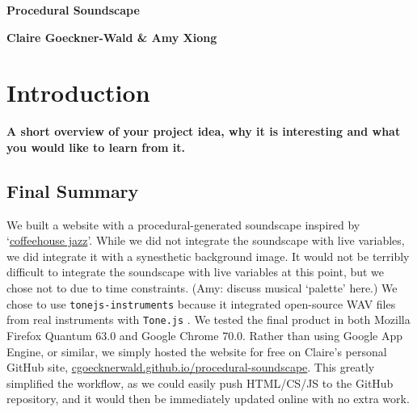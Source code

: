 \documentclass[12pt,a4paper]{article}
\newcommand{\lightcode}[1]{\colorbox{light-gray}{\texttt{#1}}}
\begin{document}
\pagestyle{plain}
 

\begin{center}
{\LARGE{\bf
{{Procedural Soundscape}}
}}
\end{center}
\bigskip

\centerline{\bf 
{Claire Goeckner-Wald \& Amy Xiong}}

\bigskip



\section{Introduction}

\textbf{A short overview of your project idea, why it is interesting and what you would like to learn from it.}

\subsection{Final Summary}
We built a website with a procedural-generated soundscape inspired by `\href{https://www.youtube.com/watch?v=K2Q6YO3Ez44}{coffeehouse jazz}'. While we did not integrate the soundscape with live variables, we did integrate it with a synesthetic background image. It would not be terribly difficult to integrate the soundscape with live variables at this point, but we chose not to due to time constraints. (Amy: discuss musical `palette' here.) We chose to use \lightcode{tonejs-instruments} because it integrated open-source WAV files from real instruments with \lightcode{Tone.js} \cite{tonejs-instruments}. We tested the final product in both Mozilla Firefox Quantum 63.0 and Google Chrome 70.0. Rather than using Google App Engine, or similar, we simply hosted the website for free on Claire's personal GitHub site, \href{https://cgoecknerwald.github.io/procedural-soundscape}{cgoecknerwald.github.io/procedural-soundscape}. This greatly simplified the workflow, as we could easily push HTML/CS/JS to the GitHub repository, and it would then be immediately updated online with no extra work.
\end{document}
